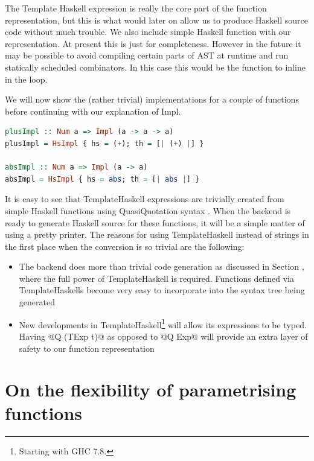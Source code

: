 \documentclass[preamble.tex]{subfiles}
\begin{document}
The Template Haskell expression is really the core part of the function representation, but this is what would later on allow us to produce Haskell source code without much trouble. We also include simple Haskell function with our representation. At present this is just for completeness. However in the future it may be possible to avoid compiling certain parts of AST at runtime and run statically scheduled combinators. In this case this would be the function to inline in the loop.

We will now show the (rather trivial) implementations for a couple of functions before continuing with our explanation of Impl.

\begin{lstlisting}[basicstyle={\ttfamily},language=Haskell]
plusImpl :: Num a => Impl (a -> a -> a)
plusImpl = HsImpl { hs = (+); th = [| (+) |] } 

absImpl :: Num a => Impl (a -> a)
absImpl = HsImpl { hs = abs; th = [| abs |] } 
\end{lstlisting}

It is easy to see that TemplateHaskell expressions are trivially created from simple Haskell functions using QuasiQuotation syntax . When the backend is ready to generate Haskell source for these functions, it will be a simple matter of using a pretty printer. The reasons for using TemplateHaskell instead of strings in the first place when the conversion is so trivial are the following:
\begin{itemize}
\item The backend does more than trivial code generation as discussed in Section , where the full power of TemplateHaskell is required. Functions defined via TemplateHaskells become very easy to incorporate into the syntax tree being generated
\item New developments in TemplateHaskell\footnote{Starting with GHC 7.8.} will allow its expressions to be typed. Having @Q (TExp t)@ as opposed to @Q Exp@ will provide an extra layer of safety to our function representation
\end{itemize}


\section{On the flexibility of parametrising functions}
\end{document}
